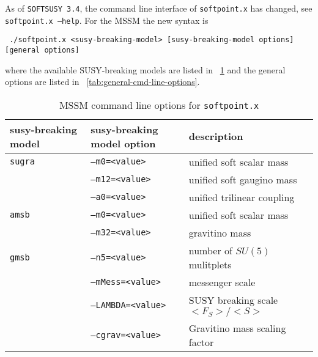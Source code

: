\documentclass[final,3p,times,pdflatex]{elsarticle}
\def\code#1{\small{\tt #1}\normalsize}
\begin{document}
As of {\tt SOFTSUSY 3.4}, the command line interface of \code{softpoint.x} has
changed, see \code{softpoint.x --help}.  For the MSSM the new syntax is
%
\small
\begin{verbatim}
 ./softpoint.x <susy-breaking-model> [susy-breaking-model options] [general options]
\end{verbatim}
\normalsize
%
where the available SUSY-breaking models are listed in
\tablename~\ref{tab:mssm-cmd-line-options} and the general options are
listed in \tablename~\ref{tab:general-cmd-line-options}.
%
\begin{table}[tbh]
  \centering
  \begin{tabular}{lll}
    susy-breaking model & susy-breaking model option & description \\
    \hline
    \code{sugra} & \code{--m0=<value>} & unified soft scalar mass \\
                 & \code{--m12=<value>} & unified soft gaugino mass \\
                 & \code{--a0=<value>} & unified trilinear coupling \\
    \hline
    \code{amsb} & \code{--m0=<value>} & unified soft scalar mass \\
                & \code{--m32=<value>} & gravitino mass \\
    \hline
    \code{gmsb} & \code{--n5=<value>} & number of $SU(5)$ mulitplets \\
                & \code{--mMess=<value>} & messenger scale \\
                & \code{--LAMBDA=<value>} & SUSY breaking scale $<F_S> / <S>$ \\
                & \code{--cgrav=<value>} & Gravitino mass scaling factor \\
    \hline
  \end{tabular}
  \caption{MSSM command line options for \code{softpoint.x}}
  \label{tab:mssm-cmd-line-options}
\end{table}
%
\end{document}
